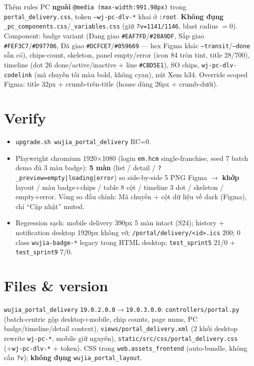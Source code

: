 Thêm rules PC \textbf{ngoài} \texttt{@media (max-width:991.98px)} trong \texttt{portal\_delivery.css}, token \texttt{--wj-pc-dlv-*} khai ở \texttt{:root}. \textbf{Không đụng} \texttt{\_pc\_components.css}/\texttt{\_variables.css} (giữ \texttt{?v=1141/1146}, blast radius $=0$). Component: badge variant (Đang giao \texttt{\#EAF7FD}/\texttt{\#28A9DF}, Sắp giao \texttt{\#FEF3C7}/\texttt{\#D97706}, Đã giao \texttt{\#DCFCE7}/\texttt{\#059669} --- hex Figma khác \texttt{--transit}/\texttt{--done} sẵn có), chips-count, skeleton, panel empty/error (icon 84 tròn tint, title 28/700), timeline (dot 26 done/active/inactive + line \texttt{\#CBD5E1}), SO chips, \texttt{wj-pc-dlv-codelink} (mã chuyến tối màu bold, không cyan), nút Xem h34. Override scoped Figma: title 32px + crumb-trên-title (house dùng 26px + crumb-dưới).

\section{Verify}

\begin{itemize}
  \item \texttt{upgrade.sh wujia\_portal\_delivery} RC=0.
  \item Playwright chromium 1920$\times$1080 (login \texttt{em.hcm} single-franchise, seed 7 batch demo đủ 3 màu badge): \textbf{5 màn} (list / detail / \texttt{?\_preview=empty|loading|error}) so side-by-side 5 PNG Figma \(\rightarrow\) \textbf{khớp} layout / màu badge+chips / table 8 cột / timeline 3 dot / skeleton / empty+error. Vòng so đầu chỉnh: Mã chuyến + cột dữ liệu về dark (Figma), chỉ ``Cập nhật'' muted.
  \item Regression sạch: mobile delivery 390px 5 màn intact (S24); history + notification desktop 1920px không vỡ; \texttt{/portal/delivery/<id>.ics} 200; 0 class \texttt{wujia-badge-*} legacy trong HTML desktop; \texttt{test\_sprint5} 21/0 + \texttt{test\_sprint9} 7/0.
\end{itemize}

\section{Files \& version}

\texttt{wujia\_portal\_delivery} \texttt{19.0.2.0.0}$\rightarrow$\texttt{19.0.3.0.0}: \texttt{controllers/portal.py} (batch-centric gộp desktop+mobile, chip counts, page nums, PC badge/timeline/detail context), \texttt{views/portal\_delivery.xml} (2 khối desktop rewrite \texttt{wj-pc-*}, mobile giữ nguyên), \texttt{static/src/css/portal\_delivery.css} (+\texttt{wj-pc-dlv-*} + token). CSS trong \texttt{web.assets\_frontend} (auto-bundle, không cần \texttt{?v}); \textbf{không đụng} \texttt{wujia\_portal\_layout}.

